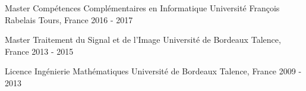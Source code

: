 

\begin{cventries}

  \cventry
    {Master Compétences Complémentaires en Informatique} %
    {Université François Rabelais} %
    {Tours, France} %
    {2016 - 2017} %
    {}
  
  \cventry
    {Master Traitement du Signal et de l'Image} %
    {Université de Bordeaux} %
    {Talence, France} %
    {2013 - 2015} %
    {}

  \cventry
    {Licence Ingénierie Mathématiques} %
    {Université de Bordeaux} %
    {Talence, France} %
    {2009 - 2013} %
    {}

\end{cventries}
